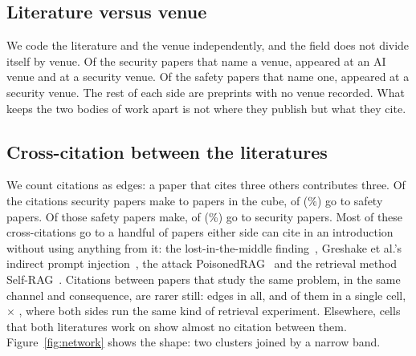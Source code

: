 \subsection{Literature versus venue}
\label{sec:venue}

We code the literature and the venue independently, and the field does not
divide itself by venue. Of the \NRegimeSecNamedVenue{} security papers that
name a venue, \NRegimeSecAtAIVenue{} appeared at an AI venue and
\NRegimeSecAtSecVenue{} at a security venue. Of the
\NRegimeSafetyNamedVenue{} safety papers that name one,
\NRegimeSafetyAtSecVenue{} appeared at a security venue. The rest of each
side are preprints with no venue recorded. What keeps the two bodies of work
apart is not where they publish but what they cite.

\subsection{Cross-citation between the literatures}
\label{sec:citation}

We count citations as edges: a paper that cites three others contributes
three. Of the citations security papers make to papers in the cube,
\NEdgeSecCross{} of \NEdgeSecTotal{}
(\PctEdgeSecCross{}\%) go to safety papers. Of those safety papers make,
\NEdgeSafCross{} of \NEdgeSafTotal{}
(\PctEdgeSafCross{}\%) go to security papers. Most of these cross-citations
go to a handful of papers either side can cite in an introduction without
using anything from it: the lost-in-the-middle finding~\cite{liu-2023-lost},
Greshake et al.'s indirect prompt injection~\cite{greshake-2023-not}, the
attack PoisonedRAG~\cite{zou-2024-poisonedrag} and the retrieval method
Self-RAG~\cite{asai-2023-selfrag}. Citations between papers that study the
same problem, in the same channel and consequence, are rarer still:
\NEdgeCrossShared{} edges in all, and \NEdgeCrossSharedRag{} of them in a
single cell,  $\times$ , where both sides
run the same kind of retrieval experiment. Elsewhere, cells that both
literatures work on show almost no citation between them.
Figure~\ref{fig:network} shows the shape: two clusters joined by a narrow
band.

